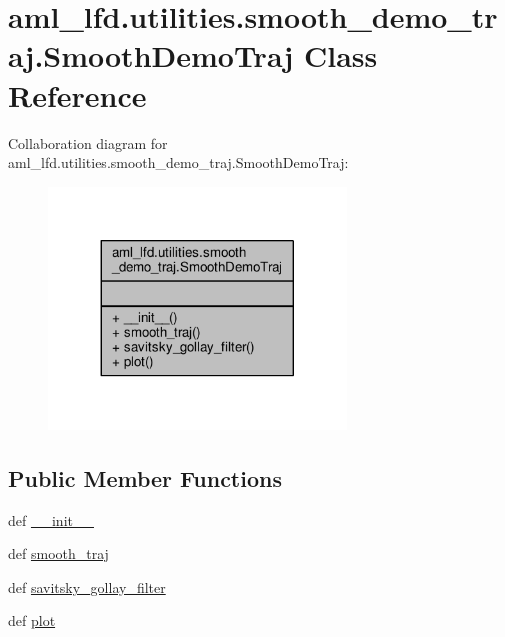 \hypertarget{classaml__lfd_1_1utilities_1_1smooth__demo__traj_1_1_smooth_demo_traj}{\section{aml\-\_\-lfd.\-utilities.\-smooth\-\_\-demo\-\_\-traj.\-Smooth\-Demo\-Traj Class Reference}
\label{classaml__lfd_1_1utilities_1_1smooth__demo__traj_1_1_smooth_demo_traj}
}


Collaboration diagram for aml\-\_\-lfd.\-utilities.\-smooth\-\_\-demo\-\_\-traj.\-Smooth\-Demo\-Traj\-:
\nopagebreak
\begin{figure}[H]
\begin{center}
\leavevmode
\includegraphics[width=224pt]{classaml__lfd_1_1utilities_1_1smooth__demo__traj_1_1_smooth_demo_traj__coll__graph}
\end{center}
\end{figure}
\subsection*{Public Member Functions}
\begin{DoxyCompactItemize}
\item 
def \hyperlink{classaml__lfd_1_1utilities_1_1smooth__demo__traj_1_1_smooth_demo_traj_ac035d625248a7ff7c5302aa8e14dcf14}{\-\_\-\-\_\-init\-\_\-\-\_\-}
\item 
def \hyperlink{classaml__lfd_1_1utilities_1_1smooth__demo__traj_1_1_smooth_demo_traj_a78ea2232742f7212da780558d0fcbd34}{smooth\-\_\-traj}
\item 
def \hyperlink{classaml__lfd_1_1utilities_1_1smooth__demo__traj_1_1_smooth_demo_traj_acaea984a5c0e4f5a41778c27936b71c9}{savitsky\-\_\-gollay\-\_\-filter}
\item 
def \hyperlink{classaml__lfd_1_1utilities_1_1smooth__demo__traj_1_1_smooth_demo_traj_a8bf09e8534a24fa61716a95fd07651ba}{plot}
\end{DoxyCompactItemize}


